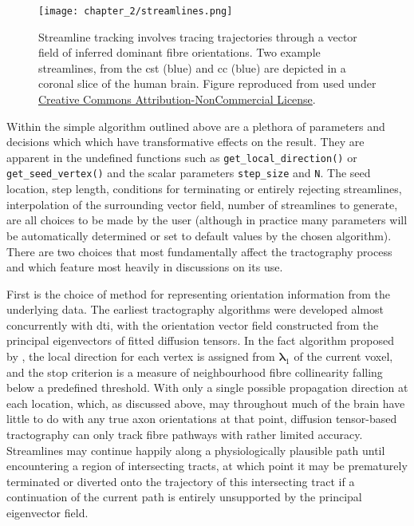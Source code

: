 \begin{figure}
  \texttt{[image: chapter\_2/streamlines.png]}
  \caption{Streamline tracking involves tracing trajectories through a vector field of inferred dominant fibre orientations. Two example streamlines, from the \gls{cst} (blue) and \gls{cc} (blue) are depicted in a coronal slice of the human brain. Figure reproduced from \textcite{Jeurissen2019} used under \href{https://creativecommons.org/licenses/by-nc/4.0/}{Creative Commons Attribution-NonCommercial License}.}
  \label{fig:tracking}
\end{figure}

Within the simple algorithm outlined above are a plethora of parameters and decisions which which have transformative effects on the result.
They are apparent in the undefined functions such as \verb|get_local_direction()| or \verb|get_seed_vertex()| and the scalar parameters \verb|step_size| and \verb|N|.
The seed location, step length, conditions for terminating or entirely rejecting streamlines, interpolation of the surrounding vector field, number of streamlines to generate, are all choices to be made by the user (although in practice many parameters will be automatically determined or set to default values by the chosen algorithm).
There are two choices that most fundamentally affect the tractography process and which feature most heavily in discussions on its use.

First is the choice of method for representing orientation information from the underlying data.
The earliest tractography algorithms were developed almost concurrently with \gls{dti}\autocite{Mori1998,Mori1999}, with the orientation vector field constructed from the principal eigenvectors of fitted diffusion tensors.
In the \gls{fact} algorithm proposed by \textcite{Mori1999}, the local direction for each vertex is assigned from $\bm{\lambda}_1$ of the current voxel, and the stop criterion is a measure of neighbourhood fibre collinearity falling below a predefined threshold.
With only a single possible propagation direction at each location, which, as discussed above, may throughout much of the brain have little to do with any true axon orientations at that point, diffusion tensor-based tractography can only track fibre pathways with rather limited accuracy.
Streamlines may continue happily along a physiologically plausible path until encountering a region of intersecting tracts, at which point it may be prematurely terminated or diverted onto the trajectory of this intersecting tract if a continuation of the current path is entirely unsupported by the principal eigenvector field.

